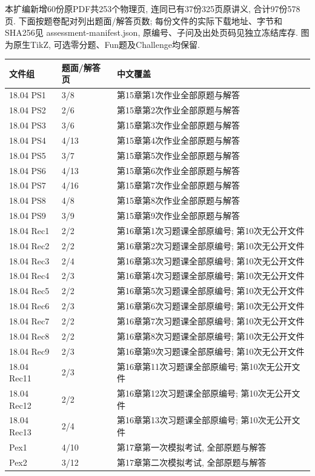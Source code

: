 本扩编新增60份原PDF共253个物理页, 连同已有37份325页原讲义, 合计97份578页. 下面按题卷配对列出题面/解答页数; 每份文件的实际下载地址、字节和SHA256见 assessment-manifest.json, 原编号、子问及出处页码见独立冻结库存. 图为原生TikZ, 可选零分题、Fun题及Challenge均保留.
\begin{longtable}{@{}p{}p{}p{}@{}}
\toprule 文件组&题面/解答页&中文覆盖\\\midrule\endhead
18.04 PS1&3/8&第15章第1次作业全部原题与解答\\
18.04 PS2&2/6&第15章第2次作业全部原题与解答\\
18.04 PS3&3/6&第15章第3次作业全部原题与解答\\
18.04 PS4&4/13&第15章第4次作业全部原题与解答\\
18.04 PS5&3/7&第15章第5次作业全部原题与解答\\
18.04 PS6&4/13&第15章第6次作业全部原题与解答\\
18.04 PS7&4/16&第15章第7次作业全部原题与解答\\
18.04 PS8&4/8&第15章第8次作业全部原题与解答\\
18.04 PS9&3/9&第15章第9次作业全部原题与解答\\
18.04 Rec1&2/2&第16章第1次习题课全部原编号; 第10次无公开文件\\
18.04 Rec2&2/2&第16章第2次习题课全部原编号; 第10次无公开文件\\
18.04 Rec3&2/4&第16章第3次习题课全部原编号; 第10次无公开文件\\
18.04 Rec4&2/3&第16章第4次习题课全部原编号; 第10次无公开文件\\
18.04 Rec5&2/2&第16章第5次习题课全部原编号; 第10次无公开文件\\
18.04 Rec6&2/3&第16章第6次习题课全部原编号; 第10次无公开文件\\
18.04 Rec7&2/2&第16章第7次习题课全部原编号; 第10次无公开文件\\
18.04 Rec8&2/2&第16章第8次习题课全部原编号; 第10次无公开文件\\
18.04 Rec9&2/3&第16章第9次习题课全部原编号; 第10次无公开文件\\
18.04 Rec11&2/3&第16章第11次习题课全部原编号; 第10次无公开文件\\
18.04 Rec12&2/2&第16章第12次习题课全部原编号; 第10次无公开文件\\
18.04 Rec13&2/4&第16章第13次习题课全部原编号; 第10次无公开文件\\
Pex1&4/10&第17章第一次模拟考试, 全部原题与解答\\
Pex2&3/12&第17章第二次模拟考试, 全部原题与解答\\

\end{longtable}
